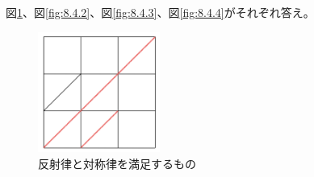 \documentclass{jsarticle}
\begin{document}
\subsection{}
図\ref{fig:8.4.1}、図\ref{fig:8.4.2}、図\ref{fig:8.4.3}、図\ref{fig:8.4.4}がそれぞれ答え。
\begin{figure}[htbp]
  \begin{center}
    \includegraphics[clip,width=4.0cm]{8_4/8_4_1.png}
    \caption{反射律と対称律を満足するもの}
    \label{fig:8.4.1}
  \end{center}
\end{figure}
\end{document}
